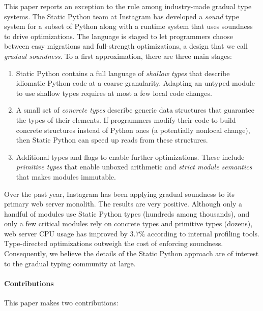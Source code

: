 \documentclass[english,cleveref,submission]{programming}
\newcommand{\SP}{Static Python}
\newcommand{\CPUchange}{3.7\%}
\begin{document}
This paper reports an exception to the rule among industry-made gradual type systems.
The \SP{} team at Instagram has developed a \emph{sound} type system for a subset of
Python along with a runtime system that uses soundness to drive optimizations.
The language is staged to let programmers choose between easy migrations and
full-strength optimizations, a design that we call \emph{gradual soundness}.
To a first approximation, there are three main stages:
\begin{enumerate}
  \item
    \SP{} contains a full language of \emph{shallow types}\/ that describe idiomatic
    Python code at a coarse granularity.
    Adapting an untyped module to use shallow types requires at most a few local code
    changes.
  \item
    A small set of \emph{concrete types}\/ describe generic data structures
    that guarantee the types of their elements.
    If programmers modify their code to build concrete structures instead of Python
    ones (a potentially nonlocal change), then \SP{} can speed up reads from these
    structures.
  \item
    Additional types and flags to enable further optimizations.
    These include \emph{primitive types}\/ that enable unboxed arithmetic
    and \emph{strict module semantics}\/ that makes modules immutable.
\end{enumerate}

Over the past year, Instagram has been applying gradual soundness to its
primary web server monolith.
The results are very positive.
Although only a handful of modules use \SP{} types (hundreds among thousands),
and only a few critical modules rely on concrete types and primitive types (dozens),
web server CPU usage has improved by \CPUchange{} according to internal profiling tools.
Type-directed optimizations outweigh the cost of enforcing soundness.
Consequently, we believe the details of the \SP{} approach are of interest to
the gradual typing community at large.


\paragraph*{Contributions}
This paper makes two contributions:
\end{document}
